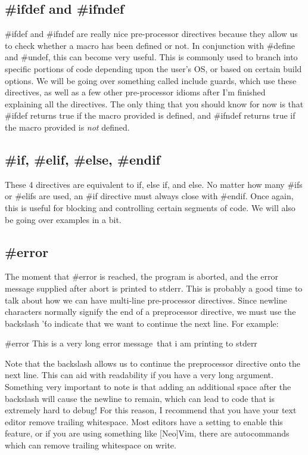 \documentclass{article}
\begin{document}
\subsection{\#ifdef and \#ifndef}

\#ifdef and \#ifndef are really nice pre-processor directives because they allow us to check whether a macro has
been defined or not. In conjunction with \#define and \#undef, this can become very useful. This is commonly
used to branch into specific portions of code depending upon the user's OS, or based on certain build options.
We will be going over something called include guards, which use these directives, as well as a few other
pre-processor idioms after I'm finished explaining all the directives. The only thing that you should know for
now is that \#ifdef returns true if the macro provided is defined, and \#ifndef returns true if the macro
provided is \textit{not} defined.

\subsection{\#if, \#elif, \#else, \#endif}

These 4 directives are equivalent to if, else if, and else. No matter how many \#ifs or \#elifs are used, an
\#if directive must always close with \#endif. Once again, this is useful for blocking and controlling certain
segments of code. We will also be going over examples in a bit.

\subsection{\#error}

The moment that \#error is reached, the program is aborted, and the error message supplied after abort is
printed to stderr. This is probably a good time to talk about how we can have multi-line pre-processor
directives. Since newline characters normally signify the end of a preprocessor directive, we must use the
backslash '\' to indicate that we want to continue the next line. For example:

\begin{cblk}
#error This is a very long error message\
    that i am printing to stderr
\end{cblk}

Note that the backslash allows us to continue the preprocessor directive onto the next line. This can aid with
readability if you have a very long argument. Something very important to note is that adding an additional
space after the backslash will cause the newline to remain, which can lead to code that is extremely hard to
debug! For this reason, I recommend that you have your text editor remove trailing whitespace. Most editors
have a setting to enable this feature, or if you are using something like [Neo]Vim, there are autocommands
which can remove trailing whitespace on write.
\end{document}

